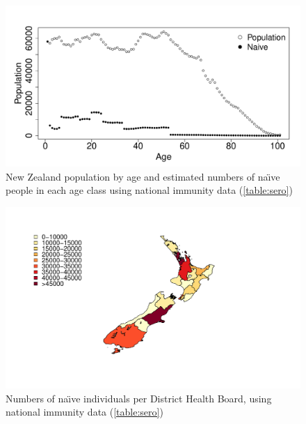 \documentclass{article}
\begin{document}
\begin{figure}
\begin{center}
\includegraphics{draftfinalreport_v2-033}
\end{center}
\caption{New Zealand population by age and estimated numbers of na\"{\i}ve people in each age class using national immunity data (\autoref{table:sero})}
\label{fig:naive}
\end{figure}

\begin{figure}[H]
     \begin{center}
     \includegraphics[width=1.2\textwidth]{naive_map.pdf}
     \end{center}
     \caption{Numbers of na\"{\i}ve individuals per District Health Board, using national immunity data (\autoref{table:sero})}
     \label{fig:naive_map}
\end{figure}
\end{document}
